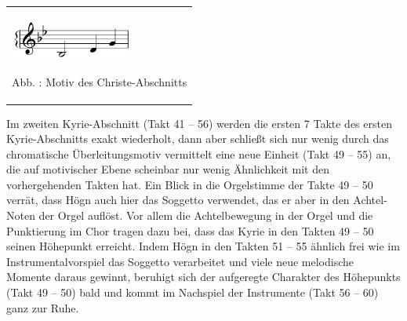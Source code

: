 \documentclass[a4paper]{article}
\newcounter{Abb}
\renewcommand\theAbb{\arabic{Abb}}
\begin{document}
\begin{center}
\begin{minipage}{4.394cm}
\begin{flushleft}
\tablefirsthead{}
\tablehead{}
\tabletail{}
\tablelasttail{}
\begin{supertabular}{m{4.1940002cm}}

\includegraphics[width=4.011cm,height=1.378cm]{pictures/zulassungsarbeit-img119.png}

Abb. \stepcounter{Abb}{\theAbb}: Motiv des Christe-Abschnitts\\
\end{supertabular}
\end{flushleft}
\end{minipage}
\end{center}
Im zweiten Kyrie-Abschnitt (Takt 41 – 56) werden die ersten 7 Takte des
ersten Kyrie-Abschnitts exakt wiederholt, dann aber schließt sich nur
wenig durch das chromatische Überleitungsmotiv vermittelt eine neue
Einheit (Takt 49 – 55) an, die auf motivischer Ebene scheinbar nur
wenig Ähnlichkeit mit den vorhergehenden Takten hat. Ein Blick in die
Orgelstimme der Takte 49 – 50 verrät, dass Högn auch hier das Soggetto
verwendet, das er aber in den Achtel-Noten der Orgel auflöst. Vor allem
die Achtelbewegung in der Orgel und die Punktierung im Chor tragen dazu
bei, dass das Kyrie in den Takten 49 – 50 seinen Höhepunkt erreicht.
Indem Högn in den Takten 51 – 55 ähnlich frei wie im
Instrumentalvorspiel das Soggetto verarbeitet und viele neue melodische
Momente daraus gewinnt, beruhigt sich der aufgeregte Charakter des
Höhepunkts (Takt 49 – 50) bald und kommt im Nachspiel der Instrumente
(Takt 56 – 60) ganz zur Ruhe.
\end{document}
